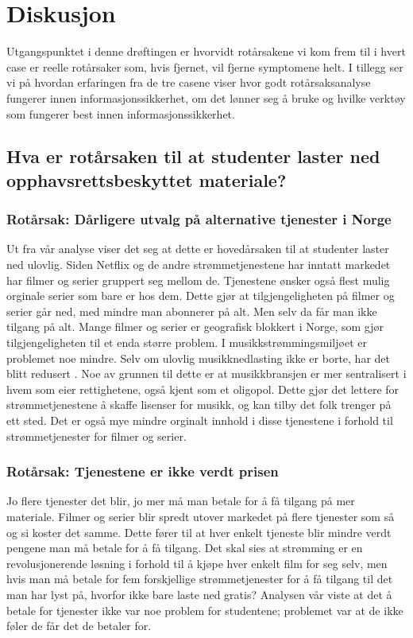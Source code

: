 \chapter{Diskusjon}
\label{kap:diskusjon}
Utgangspunktet i denne drøftingen er hvorvidt rotårsakene vi kom frem til i hvert case er reelle rotårsaker som, hvis fjernet, vil fjerne symptomene helt. I tillegg ser vi på hvordan erfaringen fra de tre casene viser hvor godt rotårsaksanalyse fungerer innen informasjonssikkerhet, om det lønner seg å bruke og hvilke verktøy som fungerer best innen informasjonssikkerhet. 

\section{Hva er rotårsaken til at studenter laster ned opphavsrettsbeskyttet materiale?}
\subsection*{Rotårsak: Dårligere utvalg på alternative tjenester i Norge}
Ut fra vår analyse viser det seg at dette er hovedårsaken til at studenter laster ned ulovlig. Siden Netflix og de andre strømmetjenestene har inntatt markedet har filmer og serier gruppert seg mellom de. Tjenestene ønsker også flest mulig orginale serier som bare er hos dem. Dette gjør at tilgjengeligheten på filmer og serier går ned, med mindre man abonnerer på alt. Men selv da får man ikke tilgang på alt. Mange filmer og serier er geografisk blokkert i Norge, som gjør tilgjengeligheten til et enda større problem. I musikkstrømmingsmiljøet er problemet noe mindre. Selv om ulovlig musikknedlasting ikke er borte, har det blitt redusert \cite{musikkstream}. Noe av grunnen til dette er at musikkbransjen er mer sentralisert i hvem som eier rettighetene, også kjent som et oligopol. Dette gjør det lettere for strømmetjenestene å skaffe lisenser for musikk, og kan tilby det folk trenger på ett sted. Det er også mye mindre orginalt innhold i disse tjenestene i forhold til strømmetjenester for filmer og serier. 

\subsection*{Rotårsak: Tjenestene er ikke verdt prisen}
Jo flere tjenester det blir, jo mer må man betale for å få tilgang på mer materiale. Filmer og serier blir spredt utover markedet på flere tjenester som så og si koster det samme. Dette fører til at hver enkelt tjeneste blir mindre verdt pengene man må betale for å få tilgang. Det skal sies at strømming er en revolusjonerende løsning i forhold til å kjøpe hver enkelt film for seg selv, men hvis man må betale for fem forskjellige strømmetjenester for å få tilgang til det man har lyst på, hvorfor ikke bare laste ned gratis? Analysen vår viste at det å betale for tjenester ikke var noe problem for studentene; problemet var at de ikke føler de får det de betaler for. 

